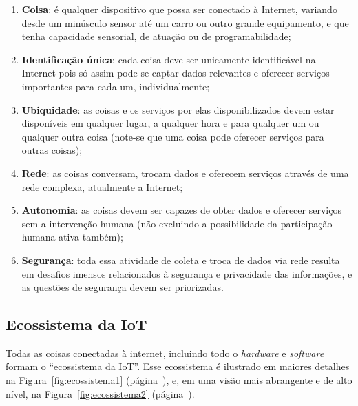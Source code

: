 \documentclass[pdftex, brazil, 12pt, twoside]{article}
\newcommand{\ingles}[1]{\textit{#1}}
\begin{document}
\begin{enumerate}
\item \textbf{Coisa}: é qualquer dispositivo que possa ser conectado
  à Internet, variando desde um minúsculo sensor até um carro ou outro
  grande equipamento, e que tenha capacidade sensorial, de atuação ou de
  programabilidade;
\item \textbf{Identificação única}: cada coisa deve ser unicamente
  identificável na Internet pois só assim pode-se captar dados relevantes
  e oferecer serviços importantes para cada um, individualmente;
\item \textbf{Ubiquidade}: as coisas e os serviços por elas disponibilizados
  devem estar disponíveis em qualquer lugar, a qualquer hora e para qualquer um
  ou qualquer outra coisa (note-se que uma coisa pode oferecer serviços para outras
  coisas);
\item \textbf{Rede}: as coisas conversam, trocam dados e oferecem
  serviços através de uma rede complexa, atualmente a Internet;
\item \textbf{Autonomia}: as coisas devem ser capazes de
  obter dados e oferecer serviços sem a intervenção humana (não excluindo
  a possibilidade da participação humana ativa também);
\item \textbf{Segurança}: toda essa atividade de coleta e troca de
  dados via rede resulta em desafios imensos relacionados à segurança e
  privacidade das informações, e as questões de segurança devem ser
  priorizadas.
\end{enumerate}


\subsection{Ecossistema da IoT}
\label{o-que-e-iot-ecossistema}

Todas as coisas conectadas à internet, incluindo todo o \ingles{hardware}
e \ingles{software} formam o ``ecossistema da IoT''. Esse ecossistema é ilustrado em maiores
detalhes na Figura~\ref{fig:ecossistema1} (página~\pageref{fig:ecossistema1}),
e, em uma visão mais abrangente e de alto nível, na Figura~\ref{fig:ecossistema2}
(página~\pageref{fig:ecossistema2}).
\end{document}

